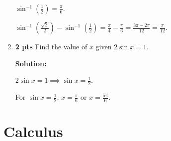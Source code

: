 \documentclass[nohyper,nobib,xcolor=dvipsnames,svgnames,x11names]{tufte-book}
\begin{document}
\begin{enumerate}
    $\sin^{-1}(\frac{1}{2}) = \frac{\pi}{6}$.
    
    $\sin^{-1}(\frac{\sqrt{2}}{2})-\sin^{-1}(\frac{1}{2}) = \frac{\pi}{4}-\frac{\pi}{6} = \frac{3\pi-2\pi}{12} = \frac{\pi}{12}$.

    \item \textbf{2 pts} Find the value of $x$ given $2\sin x=1$.
    
    \textbf{Solution:}
    
    $2\sin x=1 \implies \sin x = \frac{1}{2}$.
    
    For $\sin x = \frac{1}{2}$, $x = \frac{\pi}{6}$ or $x = \frac{5\pi}{6}$.

\end{enumerate}

\section{Calculus}
\end{document}
